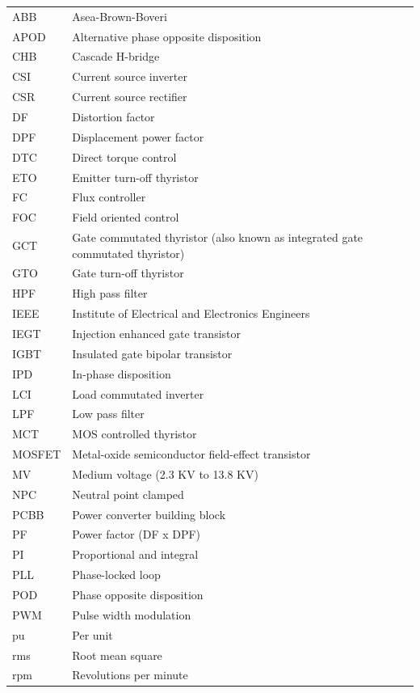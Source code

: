 \documentclass[letterpaper,12pt]{article}
\begin{document}
\begin{flushleft}
\begin{tabular}{ll}
ABB & Asea-Brown-Boveri \\
APOD & Alternative phase opposite disposition \\
CHB & Cascade H-bridge \\
CSI & Current source inverter \\
CSR & Current source rectifier \\
DF & Distortion factor \\
DPF & Displacement power factor \\
DTC & Direct torque control \\
ETO & Emitter turn-off thyristor \\
FC & Flux controller \\
FOC & Field oriented control \\
GCT & Gate commutated thyristor (also known as integrated gate commutated thyristor) \\
GTO & Gate turn-off thyristor \\
HPF & High pass filter \\
IEEE & Institute of Electrical and Electronics Engineers \\
IEGT & Injection enhanced gate transistor \\
IGBT & Insulated gate bipolar transistor \\
IPD & In-phase disposition \\
LCI & Load commutated inverter \\
LPF & Low pass filter \\
MCT & MOS controlled thyristor \\
MOSFET & Metal-oxide semiconductor field-effect transistor \\
MV & Medium voltage (2.3 KV to 13.8 KV) \\
NPC & Neutral point clamped \\
PCBB & Power converter building block \\
PF & Power factor (DF x DPF) \\
PI & Proportional and integral \\
PLL & Phase-locked loop \\
POD & Phase opposite disposition \\
PWM & Pulse width modulation \\
pu & Per unit \\
rms & Root mean square \\
rpm & Revolutions per minute \\

\end{tabular}
\end{flushleft}
\end{document}
